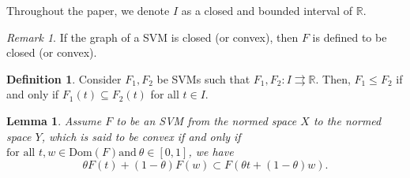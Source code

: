 \documentclass[12pt,oneside,reqno]{amsart}
\newtheorem{lemma}[theorem]{Lemma}
\theoremstyle{definition}
\newtheorem{definition}[theorem]{Definition}
\theoremstyle{remark}
\newtheorem{remark}[theorem]{Remark}
\begin{document}
Throughout the paper, we denote $I$ as a closed and bounded interval of $\mathbb{R}.$
\begin{remark}\cite{Aubin}
 If the graph of a SVM is closed (or convex), then $F$ is defined to be closed (or convex).
 \end{remark}

 \begin{definition}\label{order}
 Consider $F_1,F_2$ be SVMs such that $F_1, F_2: I\rightrightarrows \mathbb{R}$. Then, $F_1\leq F_2$ if and only if $F_1(t)\subseteq F_2(t)$ for all $t\in I$.
 \end{definition}
 \begin{lemma}\emph{\cite{Aubin}}
Assume $F$ to be an SVM from the normed space $X$ to the normed space $Y$, which is said to be convex if and only if $\text{for all } t, w \in \text{Dom}(F) \text{and}~\theta \in [0,1]$, we have
 \[\theta F(t)+(1-\theta)F(w) \subset F\left(\theta t+(1-\theta)w\right).\]
\end{lemma}
\end{document}
